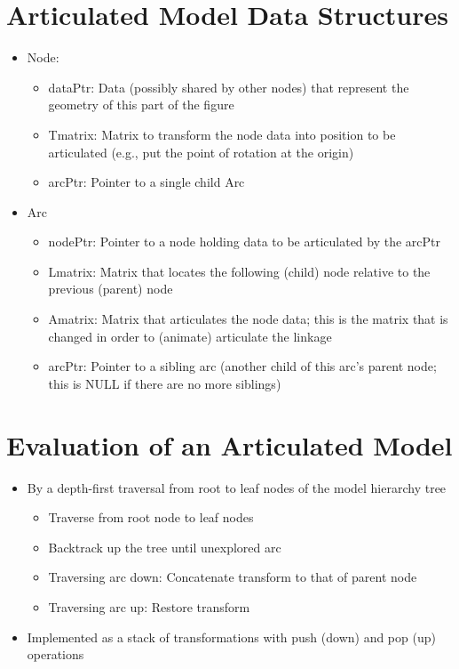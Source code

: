 \documentclass{article}
\begin{document}
\section*{Articulated Model Data Structures}
\begin{itemize}
    \item Node:
    \begin{itemize}
        \item dataPtr: Data (possibly shared by other nodes) that represent the geometry of this part of the figure
        \item Tmatrix: Matrix to transform the node data into position to be articulated (e.g., put the point of rotation at the origin)
        \item arcPtr: Pointer to a single child Arc
    \end{itemize}
    \item Arc
    \begin{itemize}
        \item nodePtr: Pointer to a node holding data to be articulated by the arcPtr
        \item Lmatrix: Matrix that locates the following (child) node relative to the previous (parent) node
        \item Amatrix: Matrix that articulates the node data; this is the matrix that is changed in order to (animate) articulate the linkage
        \item arcPtr: Pointer to a sibling arc (another child of this arc's parent node; this is NULL if there are no more siblings)
    \end{itemize}
\end{itemize}

\section*{Evaluation of an Articulated Model}
\begin{itemize}
    \item By a depth-first traversal from root to leaf nodes of the model hierarchy tree
    \begin{itemize}
        \item Traverse from root node to leaf nodes
        \item Backtrack up the tree until unexplored arc
        \item Traversing arc down: Concatenate transform to that of parent node
        \item Traversing arc up: Restore transform
    \end{itemize}
    \item Implemented as a stack of transformations with push (down) and pop (up) operations
\end{itemize}
\end{document}
